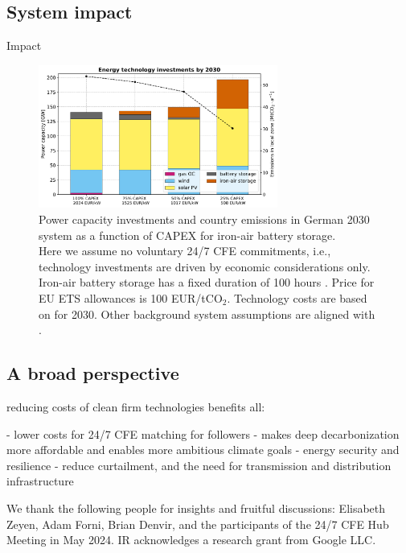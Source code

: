 \documentclass[pdflatex,sn-basic, Numbered]{sn-jnl}%
\theoremstyle{thmstyleone}%
\theoremstyle{thmstyletwo}%
\theoremstyle{thmstylethree}%
\begin{document}
\subsection*{System impact}\label{sec3}

Impact
\lipsum[1]

\FloatBarrier
\begin{figure}[htbp]
    \centering
    \includegraphics[width=0.7\textwidth]{images/dashboard_3.pdf}
    \captionsetup{width=0.7\textwidth}
    \caption{Power capacity investments and country emissions in German 2030 system as a function of CAPEX for iron-air battery storage. \\ 
    Here we assume no voluntary 24/7 CFE commitments, i.e., technology investments are driven by economic considerations only. Iron-air battery storage has a fixed duration of 100 hours \cite{FormEnergyLatest2024}. Price for EU ETS allowances is 100 EUR/tCO$_2$. Technology costs are based on \citet{DEA-technologydata} for 2030. Other background system assumptions are aligned with \citet{riepin-zenodo-systemlevel247}.}\label{fig:impact}
\end{figure}
\FloatBarrier


\subsection*{A broad perspective}\label{sec4} 

reducing costs of clean firm technologies benefits all:

- lower costs for 24/7 CFE matching for followers
- makes deep decarbonization more affordable and enables more ambitious climate goals
- energy security and resilience
- reduce curtailment, and the need for transmission and distribution infrastructure

\backmatter

 We thank the following people for insights and fruitful discussions: Elisabeth Zeyen, Adam Forni, Brian Denvir, and the participants of the 24/7 CFE Hub Meeting in May 2024. IR acknowledges a research grant from Google LLC.
\end{document}
